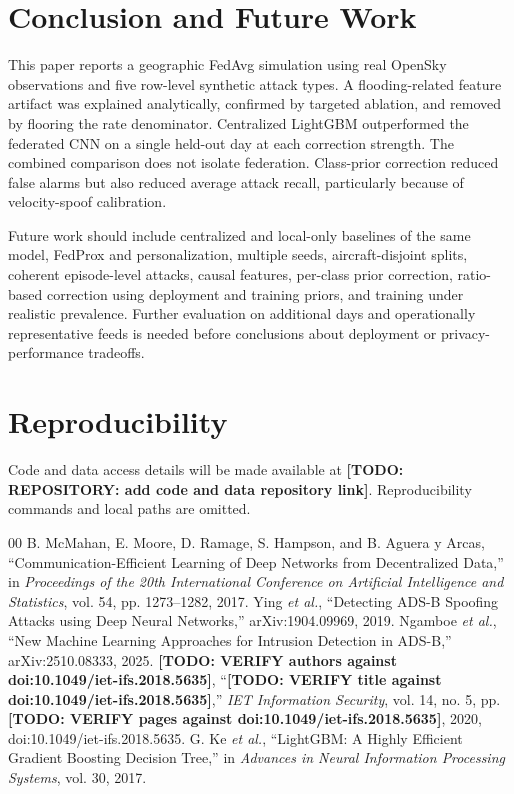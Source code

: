 \documentclass[conference]{IEEEtran}
\newcommand{\todo}[1]{\textbf{[TODO: #1]}}
\begin{document}
\section{Conclusion and Future Work}
This paper reports a geographic FedAvg simulation using real OpenSky observations and five row-level synthetic attack types. A flooding-related feature artifact was explained analytically, confirmed by targeted ablation, and removed by flooring the rate denominator. Centralized LightGBM outperformed the federated CNN on a single held-out day at each correction strength. The combined comparison does not isolate federation. Class-prior correction reduced false alarms but also reduced average attack recall, particularly because of velocity-spoof calibration.

Future work should include centralized and local-only baselines of the same model, FedProx and personalization, multiple seeds, aircraft-disjoint splits, coherent episode-level attacks, causal features, per-class prior correction, ratio-based correction using deployment and training priors, and training under realistic prevalence. Further evaluation on additional days and operationally representative feeds is needed before conclusions about deployment or privacy-performance tradeoffs.

\section*{Reproducibility}
Code and data access details will be made available at \todo{REPOSITORY: add code and data repository link}. Reproducibility commands and local paths are omitted.

\begin{thebibliography}{00}
 B. McMahan, E. Moore, D. Ramage, S. Hampson, and B. Aguera y Arcas, ``Communication-Efficient Learning of Deep Networks from Decentralized Data,'' in \emph{Proceedings of the 20th International Conference on Artificial Intelligence and Statistics}, vol. 54, pp. 1273--1282, 2017.
 Ying \emph{et al.}, ``Detecting ADS-B Spoofing Attacks using Deep Neural Networks,'' arXiv:1904.09969, 2019.
 Ngamboe \emph{et al.}, ``New Machine Learning Approaches for Intrusion Detection in ADS-B,'' arXiv:2510.08333, 2025.
 \todo{VERIFY authors against doi:10.1049/iet-ifs.2018.5635}, ``\todo{VERIFY title against doi:10.1049/iet-ifs.2018.5635},'' \emph{IET Information Security}, vol. 14, no. 5, pp. \todo{VERIFY pages against doi:10.1049/iet-ifs.2018.5635}, 2020, doi:10.1049/iet-ifs.2018.5635.
 G. Ke \emph{et al.}, ``LightGBM: A Highly Efficient Gradient Boosting Decision Tree,'' in \emph{Advances in Neural Information Processing Systems}, vol. 30, 2017.
\end{thebibliography}
\end{document}
